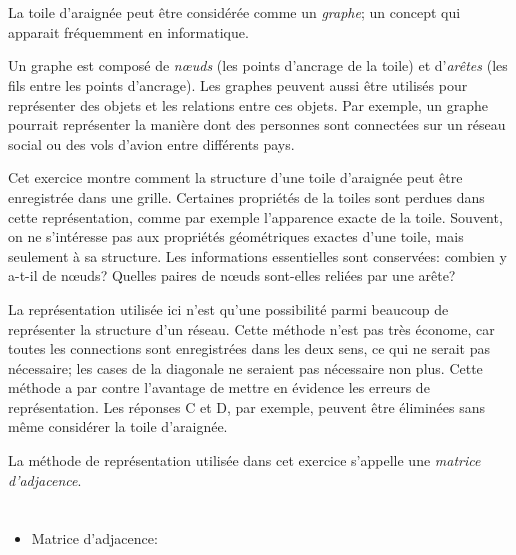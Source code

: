 {{%
\section*{\BrochureItsInformatics}
La toile d’araignée peut être considérée comme un \emph{graphe}; un concept qui apparait fréquemment en informatique.

Un graphe est composé de \emph{nœuds} (les points d’ancrage de la toile) et d’\emph{arêtes} (les fils entre les points d’ancrage). Les graphes peuvent aussi être utilisés pour représenter des objets et les relations entre ces objets. Par exemple, un graphe pourrait représenter la manière dont des personnes sont connectées sur un réseau social ou des vols d’avion entre différents pays.

Cet exercice montre comment la structure d’une toile d’araignée peut être enregistrée dans une grille. Certaines propriétés de la toiles sont perdues dans cette représentation, comme par exemple l’apparence exacte de la toile. Souvent, on ne s’intéresse pas aux propriétés géométriques exactes d’une toile, mais seulement à sa structure. Les informations essentielles sont conservées: combien y a-t-il de nœuds? Quelles paires de nœuds sont-elles reliées par une arête?

{\centering%
\par}

La représentation utilisée ici n’est qu’une possibilité parmi beaucoup de représenter la structure d’un réseau. Cette méthode n’est pas très économe, car toutes les connections sont enregistrées dans les deux sens, ce qui ne serait pas nécessaire; les cases de la diagonale ne seraient pas nécessaire non plus. Cette méthode a par contre l’avantage de mettre en évidence les erreurs de représentation. Les réponses C et D, par exemple, peuvent être éliminées sans même considérer la toile d’araignée.

La méthode de représentation utilisée dans cet exercice s’appelle une \emph{matrice d’adjacence}.



\section*{\BrochureWebsitesAndKeywords}
{\raggedright
\begin{itemize}
  \item Matrice d’adjacence: \href{https://fr.wikipedia.org/wiki/Matrice_d\%27adjacence}{}
\end{itemize}


}}}
